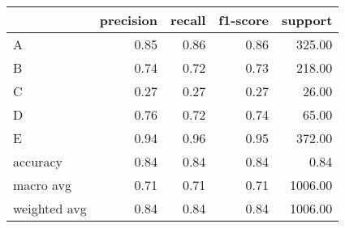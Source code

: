 \begin{tabular}{|l|r|r|r|r|}
\hline
{} &  precision &  recall &  f1-score &  support \\
\hline
A            &       0.85 &    0.86 &      0.86 &   325.00 \\
B            &       0.74 &    0.72 &      0.73 &   218.00 \\
C            &       0.27 &    0.27 &      0.27 &    26.00 \\
D            &       0.76 &    0.72 &      0.74 &    65.00 \\
E            &       0.94 &    0.96 &      0.95 &   372.00 \\
accuracy     &       0.84 &    0.84 &      0.84 &     0.84 \\
macro avg    &       0.71 &    0.71 &      0.71 &  1006.00 \\
weighted avg &       0.84 &    0.84 &      0.84 &  1006.00 \\
\hline
\end{tabular}
